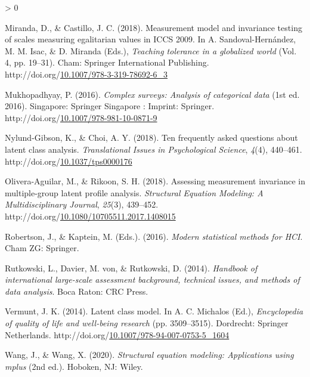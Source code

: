 \documentclass[12pt,twoside]{reedthesis}
\newlength{\cslhangindent}
\newenvironment{CSLReferences}[2] %
 {%
  \setlength{\parindent}{0pt}
  \ifodd #1 \everypar{\setlength{\hangindent}{\cslhangindent}}\ignorespaces\fi
  \ifnum #2 > 0
  \setlength{\parskip}{#2\baselineskip}
  \fi
 }%
 {}
\begin{document}
\begin{CSLReferences}{1}{0}
\leavevmode\hypertarget{ref-miranda_measurement_2018}{}%
Miranda, D., \& Castillo, J. C. (2018). Measurement model and invariance testing of scales measuring egalitarian values in {ICCS} 2009. In A. Sandoval-Hernández, M. M. Isac, \& D. Miranda (Eds.), \emph{Teaching tolerance in a globalized world} (Vol. 4, pp. 19--31). Cham: Springer International Publishing. http://doi.org/\href{https://doi.org/10.1007/978-3-319-78692-6_3}{10.1007/978-3-319-78692-6\_3}

\leavevmode\hypertarget{ref-mukhopadhyay_complex_2016}{}%
Mukhopadhyay, P. (2016). \emph{Complex surveys: Analysis of categorical data} (1st ed. 2016). Singapore: Springer Singapore : Imprint: Springer. http://doi.org/\href{https://doi.org/10.1007/978-981-10-0871-9}{10.1007/978-981-10-0871-9}

\leavevmode\hypertarget{ref-nylund-gibson_ten_2018}{}%
Nylund-Gibson, K., \& Choi, A. Y. (2018). Ten frequently asked questions about latent class analysis. \emph{Translational Issues in Psychological Science}, \emph{4}(4), 440--461. http://doi.org/\href{https://doi.org/10.1037/tps0000176}{10.1037/tps0000176}

\leavevmode\hypertarget{ref-olivera-aguilar_assessing_2018}{}%
Olivera-Aguilar, M., \& Rikoon, S. H. (2018). Assessing measurement invariance in multiple-group latent profile analysis. \emph{Structural Equation Modeling: A Multidisciplinary Journal}, \emph{25}(3), 439--452. http://doi.org/\href{https://doi.org/10.1080/10705511.2017.1408015}{10.1080/10705511.2017.1408015}

\leavevmode\hypertarget{ref-robertson_modern_2016}{}%
Robertson, J., \& Kaptein, M. (Eds.). (2016). \emph{Modern statistical methods for {HCI}}. Cham {ZG}: Springer.

\leavevmode\hypertarget{ref-rutkowski_handbook_2014}{}%
Rutkowski, L., Davier, M. von, \& Rutkowski, D. (2014). \emph{Handbook of international large-scale assessment background, technical issues, and methods of data analysis}. Boca Raton: {CRC} Press.

\leavevmode\hypertarget{ref-michalos_latent_2014}{}%
Vermunt, J. K. (2014). Latent class model. In A. C. Michalos (Ed.), \emph{Encyclopedia of quality of life and well-being research} (pp. 3509--3515). Dordrecht: Springer Netherlands. http://doi.org/\href{https://doi.org/10.1007/978-94-007-0753-5_1604}{10.1007/978-94-007-0753-5\_1604}

\leavevmode\hypertarget{ref-wang_structural_2020}{}%
Wang, J., \& Wang, X. (2020). \emph{Structural equation modeling: Applications using mplus} (2nd ed.). Hoboken, {NJ}: Wiley.

\end{CSLReferences}

\end{document}
